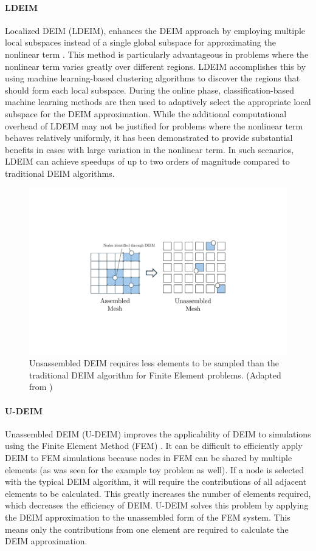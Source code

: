 \documentclass[11pt]{article}
\begin{document}
\paragraph{LDEIM} Localized DEIM (LDEIM), enhances the DEIM approach by employing multiple local subspaces instead of a single global subspace for approximating the nonlinear term \cite{peherstorfer2014localized}.
This method is particularly advantageous in problems where the nonlinear term varies greatly over different regions.
LDEIM accomplishes this by using machine learning-based clustering algorithms to discover the regions that should form each local subspace.
During the online phase, classification-based machine learning methods are then used to adaptively select the appropriate local subspace for the DEIM approximation.
While the additional computational overhead of LDEIM may not be justified for problems where the nonlinear term behaves relatively uniformly, it has been demonstrated to provide substantial benefits in cases with large variation in the nonlinear term.
In such scenarios, LDEIM can achieve speedups of up to two orders of magnitude compared to traditional DEIM algorithms.
\begin{figure}[t]
    \centering
    \includegraphics[width=0.7\linewidth]{udeim2.pdf}
    \caption{Unsassembled DEIM requires less elements to be sampled than the traditional DEIM algorithm for Finite Element problems. (Adapted from \cite{tiso2013discrete})}
    \label{fig:UDEIM}
\end{figure}
\paragraph{U-DEIM} Unassembled DEIM (U-DEIM) improves the applicability of DEIM to simulations using the Finite Element Method (FEM) \cite{tiso2013discrete}.
It can be difficult to efficiently apply DEIM to FEM simulations because nodes in FEM can be shared by multiple elements (as was seen for the example toy problem as well).
If a node is selected with the typical DEIM algorithm, it will require the contributions of all adjacent elements to be calculated.
This greatly increases the number of elements required, which decreases the efficiency of DEIM.
U-DEIM solves this problem by applying the DEIM approximation to the unassembled form of the FEM system.
This means only the contributions from one element are required to calculate the DEIM approximation.
\end{document}
